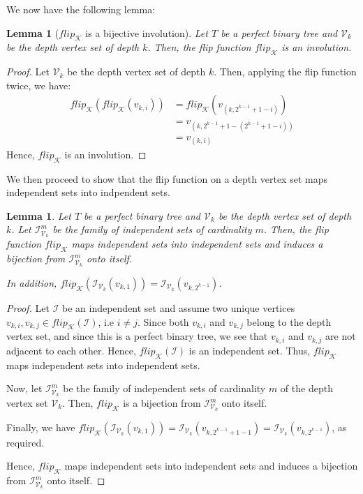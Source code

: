 \documentclass{amsart}
\newtheorem{lemma}[theorem]{Lemma}
\theoremstyle{definition}
\begin{document}
We now have the following lemma:

\begin{lemma}[$flip_\mathcal{K}$ is a bijective involution]\label{lemma_flip_bijective_involution}
  Let $T$ be a perfect binary tree and $\mathcal{V}_k$ be the depth vertex set of depth $k$. Then, the flip function $flip_\mathcal{K}$ is an involution.
\end{lemma}
\begin{proof}
  Let $\mathcal{V}_k$ be the depth vertex set of depth $k$. Then, applying the flip function twice, we have:
    \begin{align*}
      flip_\mathcal{K}(flip_\mathcal{K}(v_{k, i})) &= flip_\mathcal{K}(v_{(k, 2^{k-1} + 1 - i)}) \\
      &= v_{(k, 2^{k-1} + 1 - (2^{k-1} + 1 - i))} \\
      &= v_{(k, i)}
    \end{align*}
  Hence, $flip_\mathcal{K}$ is an involution.
\end{proof}

We then proceed to show that the flip function on a depth vertex set maps independent sets into indpendent sets.

\begin{lemma}\label{lemma_flip_independent_sets}
  Let $T$ be a perfect binary tree and $\mathcal{V}_k$ be the depth vertex set of depth $k$. Let $\mathcal{I}^m_{\mathcal{V}_k}$ be the family of independent sets of cardinality $m$. Then, the flip function $flip_\mathcal{K}$ maps independent sets into independent sets and induces a bijection from $\mathcal{I}^m_{\mathcal{V}_k}$ onto itself. 

  In addition, $flip_\mathcal{K}(\mathcal{I}_{\mathcal{V}_k}(v_{k, 1})) = \mathcal{I}_{\mathcal{V}_k}(v_{k, 2^{k-1}})$.
\end{lemma}

\begin{proof}
  Let $\mathcal{I}$ be an independent set and assume two unique vertices $v_{k, i}, v_{k, j} \in flip_\mathcal{K}(\mathcal{I})$, i.e $i \neq j$. Since both $v_{k, i}$ and $v_{k, j}$ belong to the depth vertex set, and since this is a perfect binary tree, we see that $v_{k, i}$ and $v_{k, j}$ are not adjacent to each other. Hence, $flip_\mathcal{K}(\mathcal{I})$ is an independent set. Thus, $flip_\mathcal{K}$ maps independent sets into independent sets.

  Now, let $\mathcal{I}^m_{\mathcal{V}_k}$ be the family of independent sets of cardinality $m$ of the depth vertex set $\mathcal{V}_k$. Then, $flip_\mathcal{K}$ is a bijection from $\mathcal{I}^m_{\mathcal{V}_k}$ onto itself.

  Finally, we have $flip_\mathcal{K}(\mathcal{I}_{\mathcal{V}_k}(v_{k, 1})) = \mathcal{I}_{\mathcal{V}_k}(v_{k, 2^{k-1} + 1 - 1}) = \mathcal{I}_{\mathcal{V}_k}(v_{k, 2^{k-1}})$, as required.

  Hence, $flip_\mathcal{K}$ maps independent sets into independent sets and induces a bijection from $\mathcal{I}^m_{\mathcal{V}_k}$ onto itself.
\end{proof}
\end{document}
